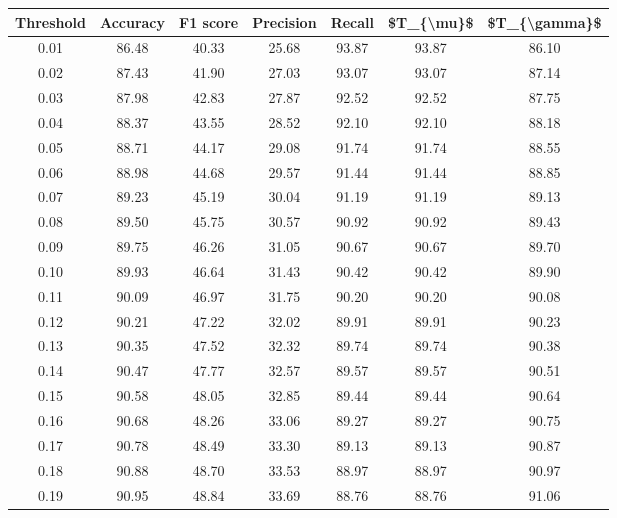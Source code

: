 \begin{tabular}{|c|c|c|c|c|c|c|}
\hline
 Threshold &  Accuracy &  F1 score &  Precision &  Recall &  \$T\_\{\textbackslash mu\}\$ &  \$T\_\{\textbackslash gamma\}\$ \\
\hline
      0.01 &     86.48 &     40.33 &      25.68 &   93.87 &      93.87 &         86.10 \\
      0.02 &     87.43 &     41.90 &      27.03 &   93.07 &      93.07 &         87.14 \\
      0.03 &     87.98 &     42.83 &      27.87 &   92.52 &      92.52 &         87.75 \\
      0.04 &     88.37 &     43.55 &      28.52 &   92.10 &      92.10 &         88.18 \\
      0.05 &     88.71 &     44.17 &      29.08 &   91.74 &      91.74 &         88.55 \\
      0.06 &     88.98 &     44.68 &      29.57 &   91.44 &      91.44 &         88.85 \\
      0.07 &     89.23 &     45.19 &      30.04 &   91.19 &      91.19 &         89.13 \\
      0.08 &     89.50 &     45.75 &      30.57 &   90.92 &      90.92 &         89.43 \\
      0.09 &     89.75 &     46.26 &      31.05 &   90.67 &      90.67 &         89.70 \\
      0.10 &     89.93 &     46.64 &      31.43 &   90.42 &      90.42 &         89.90 \\
      0.11 &     90.09 &     46.97 &      31.75 &   90.20 &      90.20 &         90.08 \\
      0.12 &     90.21 &     47.22 &      32.02 &   89.91 &      89.91 &         90.23 \\
      0.13 &     90.35 &     47.52 &      32.32 &   89.74 &      89.74 &         90.38 \\
      0.14 &     90.47 &     47.77 &      32.57 &   89.57 &      89.57 &         90.51 \\
      0.15 &     90.58 &     48.05 &      32.85 &   89.44 &      89.44 &         90.64 \\
      0.16 &     90.68 &     48.26 &      33.06 &   89.27 &      89.27 &         90.75 \\
      0.17 &     90.78 &     48.49 &      33.30 &   89.13 &      89.13 &         90.87 \\
      0.18 &     90.88 &     48.70 &      33.53 &   88.97 &      88.97 &         90.97 \\
      0.19 &     90.95 &     48.84 &      33.69 &   88.76 &      88.76 &         91.06 \\

\end{tabular}
